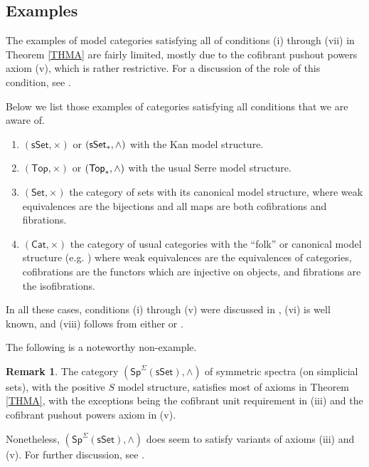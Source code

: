 \documentclass[a4paper,10pt
,draft
]{article}%
\numberwithin{equation}{section}
\numberwithin{figure}{section}
\theoremstyle{definition} %
\newtheorem{remark}[equation]{Remark}%
\newcommand{\Cat}{\mathsf{Cat}}
\newcommand{\1}{\ensuremath{\mathbbm 1}}%
\begin{document}
\subsection{Examples}



The examples of 
model categories satisfying 
all of conditions (i) through (vii)
in Theorem \ref{THMA}
are fairly limited, 
mostly due to 
the cofibrant pushout powers axiom (v),
which is rather restrictive.
For a discussion of the role of this condition,
see \cite[Rems. \ref{OC-CPPWHY REM} and
\ref{OC-SPNONEX REM}]{BP_FCOP}.

Below we list those examples of categories satisfying all conditions that we are aware of.
\begin{enumerate}[label = (\alph*)]
\item $(\mathsf{sSet},\times)$ or $(\mathsf{sSet}_{\**},\wedge)$
with the Kan model structure.
\item $(\mathsf{Top},\times)$ or $(\mathsf{Top}_{\**},\wedge)$
with the usual Serre model structure.
\item $(\mathsf{Set},\times)$ the category of sets with its canonical model structure,
where weak equivalences are the bijections and all maps are both cofibrations and fibrations.
\item $(\Cat,\times)$ the category of usual categories
with the ``folk'' or canonical model structure (e.g. \cite{Rez})
where weak equivalences are the equivalences of categories,
cofibrations are the functors which are injective on objects,
and fibrations are the isofibrations.
\end{enumerate}
In all these cases, conditions (i) through (v)
were discussed in \cite[\S \ref{OC-EXAMPLES SEC}]{BP_FCOP},
(vi) is well known, and
(viii) follows from either 
\cite[Lemma 1.12]{BM13} or \cite[Lemma 2.1]{BM13}.



The following is a noteworthy 
non-example. 


\begin{remark}
	The category $(\mathsf{Sp}^{\Sigma}(\mathsf{sSet}),\wedge)$
	of symmetric spectra (on simplicial sets),
	with the positive $S$ model structure,
	satisfies most of axioms in Theorem
	\ref{THMA}, 
	with the exceptions being 
	the cofibrant unit requirement in (iii)
	and the cofibrant pushout powers axiom in (v).
	
	Nonetheless, $(\mathsf{Sp}^{\Sigma}(\mathsf{sSet}),\wedge)$
	does seem to satisfy variants of axioms 
	(iii) and (v). For further discussion, 
	see \cite[Rem. \ref{OC-SPNONEX REM}]{BP_FCOP}.
\end{remark}
\end{document}
